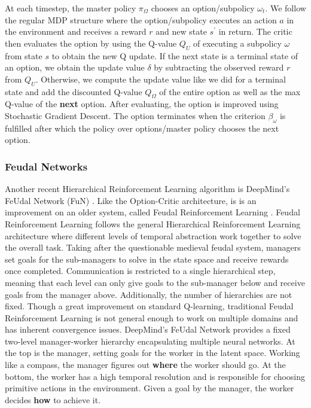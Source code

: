 \documentclass[notitlepage,a4paper,11pt]{article}
\begin{document}
At each timestep, the master policy $\pi_\Omega$ chooses an option/subpolicy $\omega_t$. We follow the regular MDP structure where the option/subpolicy executes an action $a$ in the environment and receives a reward $r$ and new state $s^\prime$ in return. The critic then evaluates the option by using the Q-value $Q_U$ of executing a subpolicy $\omega$ from state $s$ to obtain the new Q update. If the next state is a terminal state of an option, we obtain the update value $\delta$ by subtracting the observed reward $r$ from $Q_U$. Otherwise, we compute the update value like we did for a terminal state and add the discounted Q-value $Q_\Omega$ of the entire option as well as the max Q-value of the \textbf{next} option. After evaluating, the option is improved using Stochastic Gradient Descent. The option terminates when the criterion $\beta_\omega$ is fulfilled after which the policy over options/master policy chooses the next option. 

\subsubsection{Feudal Networks}
Another recent Hierarchical Reinforcement Learning algorithm is DeepMind's FeUdal Network (FuN) \cite{vezhnevets2017feudal}. Like the Option-Critic architecture, is is an improvement on an older system, called Feudal Reinforcement Learning \cite{dayan1993feudal}. Feudal Reinforcement Learning follows the general Hierarchical Reinforcement Learning architecture where different levels of temporal abstraction work together to solve the overall task. Taking after the questionable medieval feudal system, managers set goals for the sub-managers to solve in the state space and receive rewards once completed. Communication is restricted to a single hierarchical step, meaning that each level can only give goals to the sub-manager below and receive goals from the manager above. Additionally, the number of hierarchies are not fixed. Though a great improvement on standard Q-learning, traditional Feudal Reinforcement Learning is not general enough to work on multiple domains and has inherent convergence issues. DeepMind's FeUdal Network provides a fixed two-level manager-worker hierarchy encapsulating multiple neural networks. At the top is the manager, setting goals for the worker in the latent space. Working like a compass, the manager figures out \textbf{where} the worker should go. At the bottom, the worker has a high temporal resolution and is responsible for choosing primitive actions in the environment. Given a goal by the manager, the worker decides \textbf{how} to achieve it.
\end{document}
